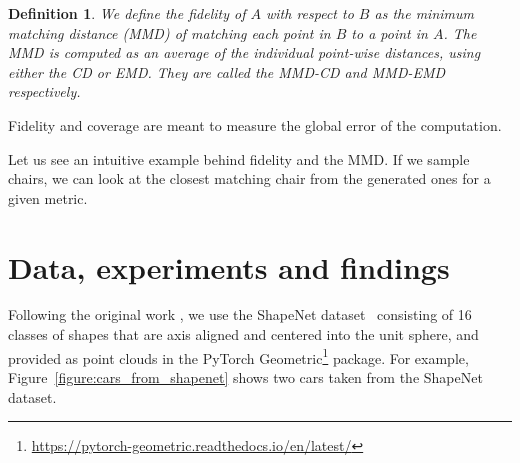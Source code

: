 \documentclass[12pt]{article}
\newtheorem{definition}{Definition}
\newcommand{\contentdescription}[1]{}
\begin{document}
    \begin{definition}
        \normalfont
        We define the \emph{fidelity} of $A$ with respect to $B$ as the \emph{minimum matching distance} (MMD) of matching each point in $B$ to a point in $A$.
        The \emph{MMD} is computed as an average of the individual point-wise distances, using either the CD or EMD.
        They are called the \emph{MMD-CD} and \emph{MMD-EMD} respectively.
    \end{definition}

    Fidelity and coverage are meant to measure the global error of the computation.

    Let us see an intuitive example behind fidelity and the MMD.
    If we sample chairs, we can look at the closest matching chair from the generated ones for a given metric.


    \section{Data, experiments and findings}
    \contentdescription{
        Data, experiments and findings (30-40\%):
        Describe the data you are working with for your project.
        What type of data is it?
        Where did it come from?
        How much data are you working with?
        Did you have to do any preprocessing, filtering, or other special treatment to use this data in your project?
        Describe and present the experiments that you performed and what is the reason for those experiments.
        Where applicable define evaluation metrics that you used. Discuss the results that you got.
    }

    Following the original work \cite{pmlr-v80-achlioptas18a}, we use the ShapeNet dataset~\cite{arxiv:1512.03012} consisting of 16 classes of shapes
    that are axis aligned and centered into the unit sphere, and provided as point clouds in the PyTorch Geometric\footnote{\url{https://pytorch-geometric.readthedocs.io/en/latest/}} package.
    For example, Figure~\ref{figure:cars_from_shapenet} shows two cars taken from the ShapeNet dataset.
\end{document}
